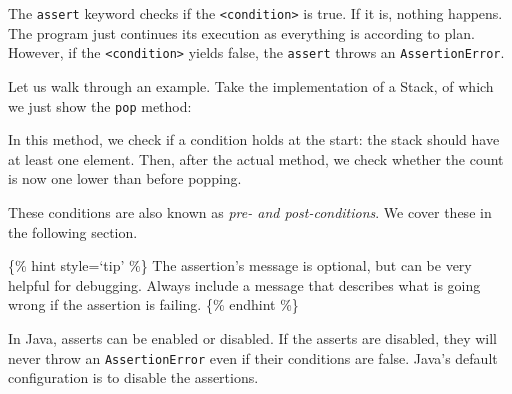 \begin{Shaded}
\begin{Highlighting}[]
\NormalTok{;}
\end{Highlighting}
\end{Shaded}

The \texttt{assert} keyword checks if the
\texttt{\textless{}condition\textgreater{}} is true. If it is, nothing
happens. The program just continues its execution as everything is
according to plan. However, if the
\texttt{\textless{}condition\textgreater{}} yields false, the
\texttt{assert} throws an \texttt{AssertionError}.

Let us walk through an example. Take the implementation of a Stack, of
which we just show the \texttt{pop} method:

\begin{Shaded}
\begin{Highlighting}[]
 
    \NormalTok{() \{}
\NormalTok{() \textgreater{} }\NormalTok{ : }\NormalTok{;}


\NormalTok{ : }\NormalTok{;}
\NormalTok{  \}}
\NormalTok{\}}
\end{Highlighting}
\end{Shaded}

In this method, we check if a condition holds at the start: the stack
should have at least one element. Then, after the actual method, we
check whether the count is now one lower than before popping.

These conditions are also known as \emph{pre- and post-conditions}. We
cover these in the following section.

\{\% hint style=`tip' \%\} The assertion's message is optional, but can
be very helpful for debugging. Always include a message that describes
what is going wrong if the assertion is failing. \{\% endhint \%\}

In Java, asserts can be enabled or disabled. If the asserts are
disabled, they will never throw an \texttt{AssertionError} even if their
conditions are false. Java's default configuration is to disable the
assertions.


